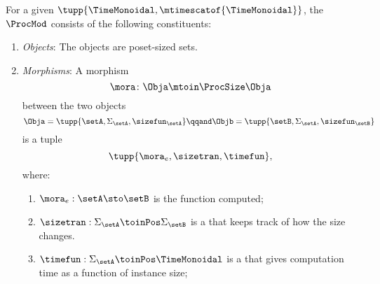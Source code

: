 \begin{definition}
    \label{def:ProcMod}
    For a given  $\tupp{\TimeMonoidal, \mtimescatof{\TimeMonoidal}}$, the ~$\ProcMod$ consists of the following constituents:
    \begin{enumerate}
        \item \emph{Objects}: The objects are poset-sized sets.
        \item \emph{Morphisms}: A morphism
              \begin{equation}
                  \mora \colon \Obja \mtoin\ProcSize \Obja
              \end{equation}
              between the two objects
              \begin{equation}
                  \Obja = \tupp{\setA, \Sigma_{\setA}, \sizefun_{\setA}}
                  \qqand
                  \Objb = \tupp{\setB, \Sigma_{\setA}, \sizefun_{\setB}}
              \end{equation}
              is a tuple
              \begin{equation}
                  \tupp{\mora_e, \sizetran, \timefun },
              \end{equation}
              where:
              \begin{enumerate}
                  \item $\mora_e : \setA \sto \setB$ is the function computed;
                  \item $\sizetran: \Sigma_{\setA} \toinPos \Sigma_{\setB}$ is a  that keeps track of how the size changes.
                  \item $\timefun: \Sigma_{\setA} \toinPos \TimeMonoidal$ is a  that gives computation time as a function of instance size;
              \end{enumerate}


\end{enumerate}
\end{definition}
